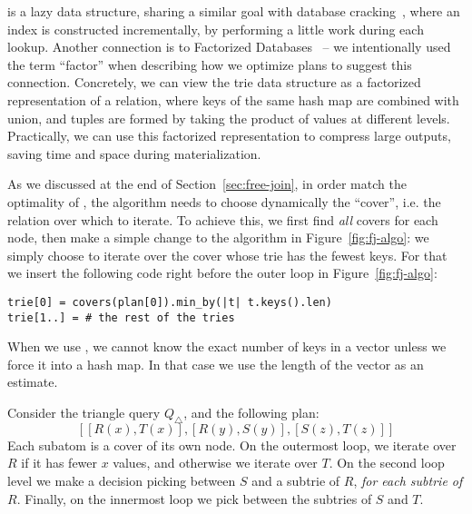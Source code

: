 \COLT is a lazy data structure, sharing a similar goal with database
cracking~\cite{DBLP:conf/cidr/IdreosKM07,DBLP:conf/sigmod/IdreosKM07}, where an
index is constructed incrementally, by performing a little work during each
lookup. 
Another connection is to Factorized Databases~\cite{DBLP:journals/sigmod/OlteanuS16} -- we
intentionally used the term ``factor'' when describing how we optimize \FJ plans to
suggest this connection. 
Concretely, we can view the trie data structure as a
factorized representation of a relation, where keys of the same hash map are
combined with union, and tuples are formed by taking the product of values at
different levels. Practically, we can use this factorized representation to 
compress large outputs, saving time and space during materialization.

As we discussed at the end of Section~\ref{sec:free-join}, in order
match the optimality of \GJ, the \FJ algorithm needs to choose
dynamically the ``cover'', i.e. the relation over which to iterate.  To
achieve this, we first find {\em all} covers for each node, then make a simple
change to the \FJ algorithm in Figure~\ref{fig:fj-algo}: we simply
choose to iterate over the cover whose trie has the fewest keys.  For
that we insert the following code right before the outer loop in
Figure~\ref{fig:fj-algo}:
%
\begin{lstlisting}
trie[0] = covers(plan[0]).min_by(|t| t.keys().len)
trie[1..] = # the rest of the tries
\end{lstlisting}
%
When we use \COLTs, we cannot know the exact number of keys in a vector unless
  we force it into a hash map. In that case we use the length of the vector as
  an estimate.

\begin{ex}
  Consider the triangle query $Q_\triangle$, and the following \FJ plan:
  $$[[R(x), T(x)], [R(y), S(y)], [S(z), T(z)]]$$  Each subatom is a
  cover of its own node.  On the outermost loop, we iterate over $R$
  if it has fewer $x$ values, and otherwise we iterate over $T$.  On
  the second loop level we make a decision picking between $S$ and a
  subtrie of $R$, \emph{for each subtrie of $R$}.  Finally, on the
  innermost loop we pick between the subtries of $S$ and $T$.
\end{ex}


